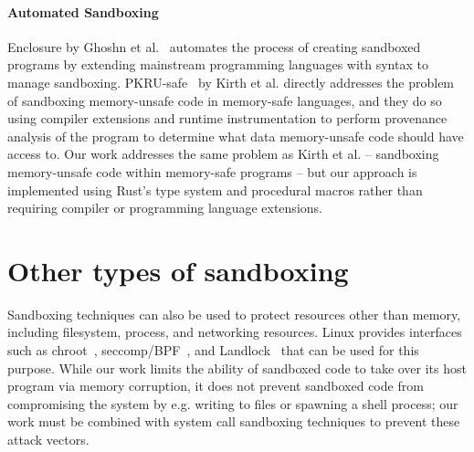 \paragraph{Automated Sandboxing} Enclosure by Ghoshn et al.~\cite{ghoshn:enclosure} automates the
process of creating sandboxed programs by extending mainstream programming languages with syntax to
manage sandboxing. PKRU-safe~\cite{kirth:pkru} by Kirth et al. directly addresses the problem of
sandboxing memory-unsafe code in memory-safe languages, and they do so using compiler extensions and
runtime instrumentation to perform provenance analysis of the program to determine what data
memory-unsafe code should have access to. Our work addresses the same problem as Kirth et al. --
sandboxing memory-unsafe code within memory-safe programs -- but our approach is implemented using
Rust's type system and procedural macros rather than requiring compiler or programming language
extensions.

\section{Other types of sandboxing} Sandboxing techniques can also be used to protect resources
other than memory, including filesystem, process, and networking resources. Linux provides
interfaces such as chroot~\cite {gnu:chroot}, seccomp/BPF~\cite {kim:mbox}, and Landlock~\cite
{linux:landlock} that can be used for this purpose. While our work limits the ability of sandboxed
code to take over its host program via memory corruption, it does not prevent sandboxed code from
compromising the system by e.g. writing to files or spawning a shell process; our work must be
combined with system call sandboxing techniques to prevent these attack vectors.
